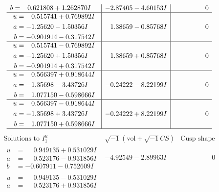 \documentclass[1p]{elsarticle_modified}
\theoremstyle{definition}
\newcommand{\I}{\sqrt{-1}}
\begin{document}
$$\begin{array}{c|c|c}
\begin{aligned}
b &= \phantom{-}0.621808 + 1.262870 I\end{aligned}
 & -2.87405 - 4.60153 I & \phantom{-0.000000 } 0 \\ \hline\begin{aligned}
u &= \phantom{-}0.515741 + 0.769892 I \\
a &= -1.25620 - 1.50356 I \\
b &= -0.901914 - 0.317542 I\end{aligned}
 & \phantom{-}1.38659 - 0.85768 I & \phantom{-0.000000 } 0 \\ \hline\begin{aligned}
u &= \phantom{-}0.515741 - 0.769892 I \\
a &= -1.25620 + 1.50356 I \\
b &= -0.901914 + 0.317542 I\end{aligned}
 & \phantom{-}1.38659 + 0.85768 I & \phantom{-0.000000 } 0 \\ \hline\begin{aligned}
u &= \phantom{-}0.566397 + 0.918644 I \\
a &= -1.35698 - 3.43726 I \\
b &= \phantom{-}1.077150 - 0.598666 I\end{aligned}
 & -0.24222 - 8.22199 I & \phantom{-0.000000 } 0 \\ \hline\begin{aligned}
u &= \phantom{-}0.566397 - 0.918644 I \\
a &= -1.35698 + 3.43726 I \\
b &= \phantom{-}1.077150 + 0.598666 I\end{aligned}
 & -0.24222 + 8.22199 I & \phantom{-0.000000 } 0\\
 \hline 
 \end{array}$$\newpage$$\begin{array}{c|c|c}  
\text{Solutions to }I^u_{1}& \I (\text{vol} + \sqrt{-1}CS) & \text{Cusp shape}\\
 \hline 
\begin{aligned}
u &= \phantom{-}0.949135 + 0.531029 I \\
a &= \phantom{-}0.523176 - 0.931856 I \\
b &= -0.607911 - 0.752609 I\end{aligned}
 & -4.92549 - 2.89963 I & \phantom{-0.000000 } 0 \\ \hline\begin{aligned}
u &= \phantom{-}0.949135 - 0.531029 I \\
a &= \phantom{-}0.523176 + 0.931856 I \\

\end{aligned}
\end{array}$$
\end{document}
